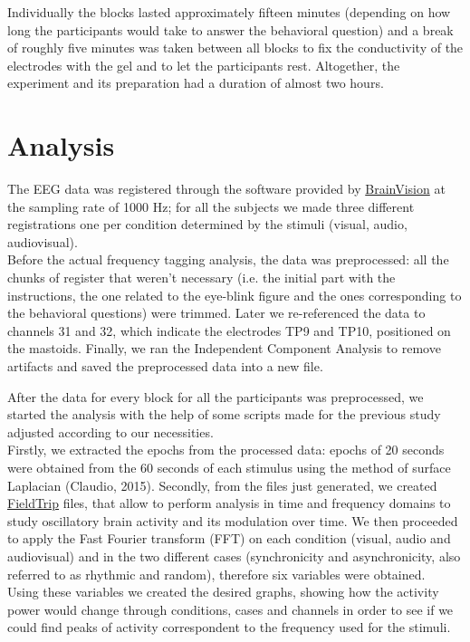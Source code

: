 Individually the blocks lasted approximately fifteen minutes (depending on how long the participants would take to answer the behavioral question) and a break of roughly five minutes was taken between all blocks to fix the conductivity of the electrodes with the gel and to let the participants rest. Altogether, the experiment and its preparation had a duration of almost two hours.

\section{Analysis}
The EEG data was registered through the software provided by \href{https://brainvision.com/applications/brain-vision-software/}{BrainVision} at the sampling rate of 1000 Hz; for all the subjects we made three different registrations one per condition determined by the stimuli (visual, audio, audiovisual). \\
Before the actual frequency tagging analysis, the data was preprocessed: all the chunks of register that weren't necessary (i.e. the initial part with the instructions, the one related to the eye-blink figure and the ones corresponding to the behavioral questions) were trimmed. Later we re-referenced the data to channels 31 and 32, which indicate the electrodes TP9 and TP10, positioned on the mastoids. Finally, we ran the Independent Component Analysis to remove artifacts and saved the preprocessed data into a new file. 

After the data for every block for all the participants was preprocessed, we started the analysis with the help of some scripts made for the previous study adjusted according to our necessities. \\
Firstly, we extracted the epochs from the processed data: epochs of 20 seconds were obtained from the 60 seconds of each stimulus using the method of surface Laplacian (Claudio, 2015). Secondly, from the files just generated, we created \href{https://www.fieldtriptoolbox.org/}{FieldTrip} files, that allow to perform analysis in time and frequency domains to study oscillatory brain activity and its modulation over time. We then proceeded to apply the Fast Fourier transform (FFT) on each condition (visual, audio and audiovisual) and in the two different cases (synchronicity and asynchronicity, also referred to as rhythmic and random), therefore six variables were obtained. \\
Using these variables we created the desired graphs, showing how the activity power would change through conditions, cases and channels in order to see if we could find peaks of activity correspondent to the frequency used for the stimuli. 

